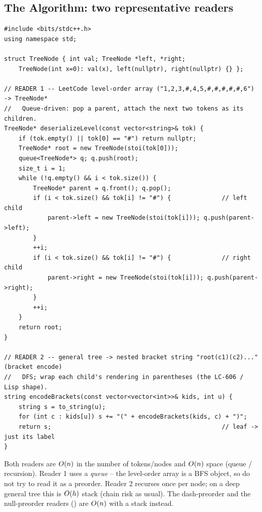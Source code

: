 \subsection{The Algorithm: two representative readers}

\begin{lstlisting}[caption={Decoding a level-order array, and emitting a general-tree bracket string}, label={lst:c04-formats}]
#include <bits/stdc++.h>
using namespace std;

struct TreeNode { int val; TreeNode *left, *right;
    TreeNode(int x=0): val(x), left(nullptr), right(nullptr) {} };

// READER 1 -- LeetCode level-order array ("1,2,3,#,4,5,#,#,#,#,#,6") -> TreeNode*
//   Queue-driven: pop a parent, attach the next two tokens as its children.
TreeNode* deserializeLevel(const vector<string>& tok) {
    if (tok.empty() || tok[0] == "#") return nullptr;
    TreeNode* root = new TreeNode(stoi(tok[0]));
    queue<TreeNode*> q; q.push(root);
    size_t i = 1;
    while (!q.empty() && i < tok.size()) {
        TreeNode* parent = q.front(); q.pop();
        if (i < tok.size() && tok[i] != "#") {              // left child
            parent->left = new TreeNode(stoi(tok[i])); q.push(parent->left);
        }
        ++i;
        if (i < tok.size() && tok[i] != "#") {              // right child
            parent->right = new TreeNode(stoi(tok[i])); q.push(parent->right);
        }
        ++i;
    }
    return root;
}

// READER 2 -- general tree -> nested bracket string "root(c1)(c2)..." (bracket encode)
//   DFS; wrap each child's rendering in parentheses (the LC-606 / Lisp shape).
string encodeBrackets(const vector<vector<int>>& kids, int u) {
    string s = to_string(u);
    for (int c : kids[u]) s += "(" + encodeBrackets(kids, c) + ")";
    return s;                                               // leaf -> just its label
}
\end{lstlisting}
\begin{complexitybox}
Both readers are $O(n)$ in the number of tokens/nodes and $O(n)$ space (queue /
recursion). Reader 1 uses a \emph{queue} -- the level-order array is a BFS object, so do not
try to read it as a preorder. Reader 2 recurses once per node; on a deep general tree this is
$O(h)$ stack (chain risk as usual). The dash-preorder and the null-preorder readers
() are $O(n)$ with a stack instead.
\end{complexitybox}

